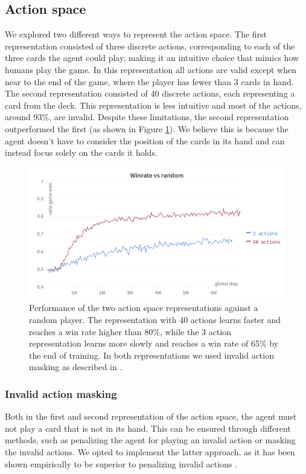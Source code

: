 \subsection{Action space}
We explored two different ways to represent the action space. The first representation consisted of three discrete actions, corresponding to each of the three cards the agent could play, making it an intuitive choice that mimics how humans play the game. In this representation all actions are valid except when near to the end of the game, where the player has fewer than 3 cards in hand. The second representation consisted of 40 discrete actions, each representing a card from the deck. This representation is less intuitive and most of the actions, around 93\%, are invalid. Despite these limitations, the second representation outperformed the first (as shown in Figure \ref{fig:action-space-comparison}). We believe this is because the agent doesn't have to consider the position of the cards in its hand and can instead focus solely on the cards it holds.
\begin{figure}[H]
    \centering
    \includegraphics[width=\textwidth]{images/action-spaces-comparison.png}
    \caption{Performance of the two action space representations against a random player. The representation with 40 actions learns faster and reaches a win rate higher than 80\%, while the 3 action representation learns more slowly and reaches a win rate of 65\% by the end of training. In both representations we used invalid action masking as described in \cite{action-masking}.}
    \label{fig:action-space-comparison}
\end{figure}

\subsubsection{Invalid action masking}
Both in the first and second representation of the action space, the agent must not play a card that is not in its hand. This can be ensured through different methods, such as penalizing the agent for playing an invalid action or masking the invalid actions. We opted to implement the latter approach, as it has been shown empirically to be superior to penalizing invalid actions \cite{action-masking}.

